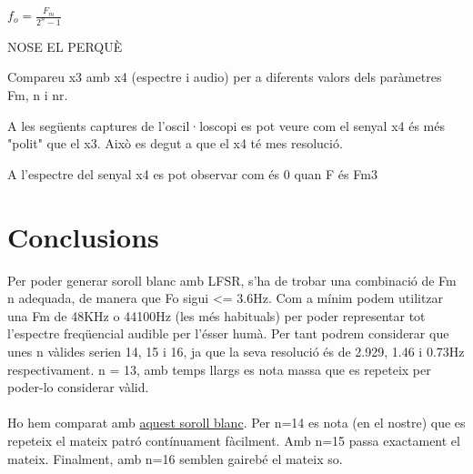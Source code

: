 \documentclass[11pt]{report}
\begin{document}
    $f_o = \frac{F_m}{2^n-1}$

NOSE EL PERQUÈ



Compareu x3 amb x4 (espectre i audio) per a diferents valors dels paràmetres Fm, n i nr.


A les següents captures de l'oscil·loscopi es pot veure com el senyal x4 és més "polit" que el x3. Això es degut a que el x4 té mes resolució.

A l'espectre del senyal x4 es pot observar com és 0 quan F és Fm3
\newpage
\section*{Conclusions}
Per poder generar soroll blanc amb LFSR, s'ha de trobar una combinació de Fm n adequada, de manera que Fo sigui <= 3.6Hz.
Com a mínim podem utilitzar una Fm de 48KHz o 44100Hz (les més habituals) per poder representar tot l'espectre freqüencial audible per l'ésser humà. Per tant podrem considerar que unes n vàlides serien 14, 15 i 16, ja que la seva resolució és de 2.929, 1.46 i 0.73Hz respectivament. n = 13, amb temps llargs es nota massa que es repeteix per poder-lo considerar vàlid.
\paragraph{}
Ho hem comparat amb \href{https://soundcloud.com/onlinetonegenerator/white-noise}{aquest soroll blanc}. Per n=14 es nota (en el nostre) que es repeteix el mateix patró contínuament fàcilment. Amb n=15 passa exactament el mateix.  Finalment, amb n=16 semblen gairebé el mateix so.
\end{document}
